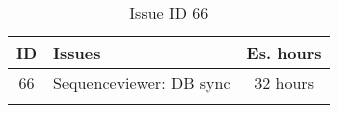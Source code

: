 \begin{longtable} { | c | p{12cm} | c | } 
\hline
	ID 	&	Issues	&		 Es. hours \\\hline
	 66	&	Sequenceviewer: DB sync	&	32 hours \\\hline
\caption{Issue ID 66}
\label{tab:spr4_SVdbSync}
\end{longtable}
